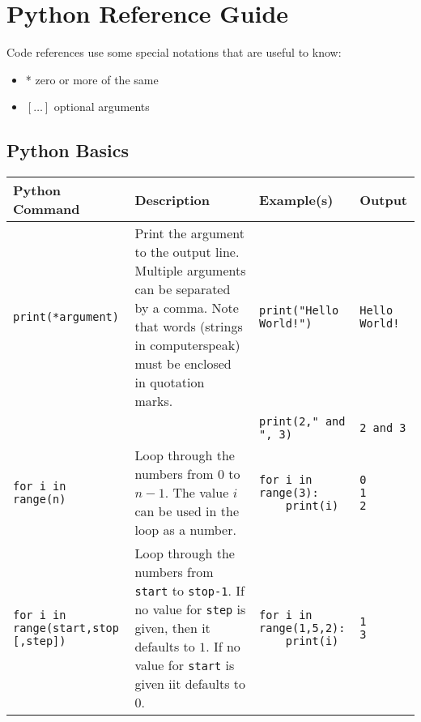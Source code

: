 \documentclass[11pt,a4paper]{report}
\begin{document}
\section{Python Reference Guide}
Code references use some special notations that are useful to know:
\begin{itemize}
\item * zero or more of the same
\item $[ \ldots ]$ optional arguments
\end{itemize}

\subsection{Python Basics}

\begin{longtable}{|p{}|p{}|p{}|p{}|}
\hline
Python Command & Description & Example(s) & Output  \\
\hline 
\endhead

\lstinline|print(*argument)| & Print the argument to the output line. Multiple arguments can be separated by a comma. Note that words (strings in computerspeak) must be enclosed in quotation marks. & \lstinline|print("Hello World!")| & \verb|Hello World!|\\
&& \lstinline|print(2," and ", 3)| & \verb|2 and 3| \\
\hline


\lstinline|for i in range(n)| & Loop through the numbers from $0$ to $n-1$. The value $i$ can be used in the loop as a number. & \begin{lstlisting}
for i in range(3):
	print(i)
\end{lstlisting} 
& \begin{verbatim}
0
1
2
\end{verbatim}\\
\hline
\lstinline|for i in range(start,stop [,step])| & Loop through the numbers from \verb|start| to \verb|stop-1|. If no value for \verb|step| is given, then it defaults to $1$. If no value for \verb|start| is given iit defaults to $0$. & \begin{lstlisting}
for i in range(1,5,2):
	print(i)
\end{lstlisting} 
& \begin{verbatim}
1
3
\end{verbatim}\\
\hline


\end{longtable}
\end{document}
